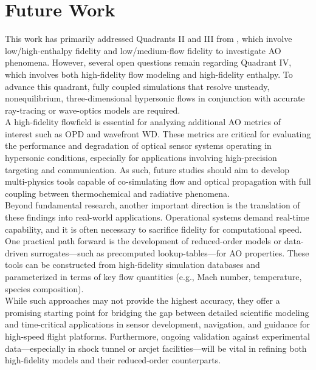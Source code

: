 \section{Future Work \label{sec:futureWork}}

This work has primarily addressed Quadrants II and III from
, which involve low/high-enthalpy fidelity and
low/medium-flow fidelity to investigate \gls{AO} phenomena. However, several open questions
remain regarding Quadrant IV, which involves both high-fidelity flow
modeling and high-fidelity enthalpy. To advance this quadrant,
fully coupled simulations that resolve unsteady, nonequilibrium,
three-dimensional hypersonic flows in conjunction with accurate ray-tracing or
wave-optics models are required. \\

A high-fidelity flowfield is essential for analyzing additional \gls{AO}
metrics of interest such as \gls{OPD} and wavefront \gls{WD}. These metrics are critical for evaluating the
performance and degradation of optical sensor systems operating in
hypersonic conditions, especially for applications involving high-precision
targeting and communication. As such, future studies should aim to develop
multi-physics tools capable of co-simulating flow and optical propagation with
full coupling between thermochemical and radiative phenomena. \\

Beyond fundamental research, another important direction is the translation of
these findings into real-world applications. Operational systems demand
real-time capability, and it is often necessary to sacrifice fidelity for
computational speed. One practical path forward is the development of
reduced-order models or data-driven surrogates—such as precomputed
lookup-tables—for \gls{AO} properties. These tools can be constructed
from high-fidelity simulation databases and parameterized in terms of key
flow quantities (e.g., Mach number, temperature, species composition).  \\

While such approaches may not provide the highest accuracy, they offer a
promising starting point for bridging the gap between detailed scientific
modeling and time-critical applications in sensor development, navigation,
and guidance for high-speed flight platforms. Furthermore, ongoing validation
against experimental data—especially in shock tunnel or arcjet facilities—will
be vital in refining both high-fidelity models and their reduced-order
counterparts.
